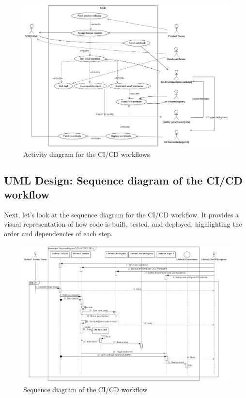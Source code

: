 \begin{figure}[H]\centering
\includegraphics[width=1.0\textwidth,angle=00]{assets/f45.png}
\caption{ Activity diagram for the CI/CD workflows}
\label{fig:Activity diagram for the CI/CD workflows}
\end{figure}

\subsection{UML Design: Sequence diagram of the CI/CD workflow }
Next, let’s look at the sequence diagram for the CI/CD workflow. It provides a visual representation of how code is built, tested, and deployed, highlighting the order and dependencies of each step.
\begin{figure}[H]\centering
\begin{sideways}
\includegraphics[height=1.0\textwidth,angle=00]{assets/f46.png}
\end{sideways}
\caption{ Sequence diagram of the CI/CD workflow}
\label{fig:sequence diagram of the CI/CD workflow}
\end{figure}

